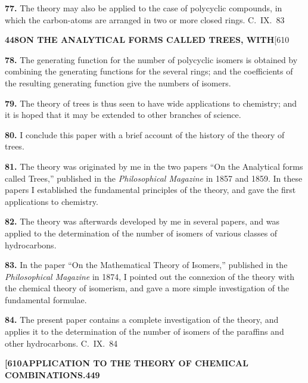 \documentclass[11pt,a4paper]{article}
\begin{document}
{\medskip
\noindent\textbf{77.}
The theory may also be applied to the case of polycyclic compounds, in which the carbon-atoms are arranged in two or more closed rings.
\hfill C.~IX.\ 83

\newpage
\noindent\textbf{448}\hspace{\fill}\textbf{ON THE ANALYTICAL FORMS CALLED TREES, WITH}\hspace{\fill}[610

\noindent\textbf{78.}
The generating function for the number of polycyclic isomers is obtained by combining the generating functions for the several rings; and the coefficients of the resulting generating function give the numbers of isomers.

\medskip
\noindent\textbf{79.}
The theory of trees is thus seen to have wide applications to chemistry; and it is hoped that it may be extended to other branches of science.

\medskip
\noindent\textbf{80.}
I conclude this paper with a brief account of the history of the theory of trees.

\medskip
\noindent\textbf{81.}
The theory was originated by me in the two papers ``On the Analytical forms called Trees,'' published in the \textit{Philosophical Magazine} in 1857 and 1859. In these papers I established the fundamental principles of the theory, and gave the first applications to chemistry.

\medskip
\noindent\textbf{82.}
The theory was afterwards developed by me in several papers, and was applied to the determination of the number of isomers of various classes of hydrocarbons.

\medskip
\noindent\textbf{83.}
In the paper ``On the Mathematical Theory of Isomers,'' published in the \textit{Philosophical Magazine} in 1874, I pointed out the connexion of the theory with the chemical theory of isomerism, and gave a more simple investigation of the fundamental formulae.

\medskip
\noindent\textbf{84.}
The present paper contains a complete investigation of the theory, and applies it to the determination of the number of isomers of the paraffins and other hydrocarbons.
\hfill C.~IX.\ 84

\newpage
\noindent\textbf{[610}\hspace{\fill}\textbf{APPLICATION TO THE THEORY OF CHEMICAL COMBINATIONS.}\hspace{\fill}\textbf{449}

}
\end{document}
